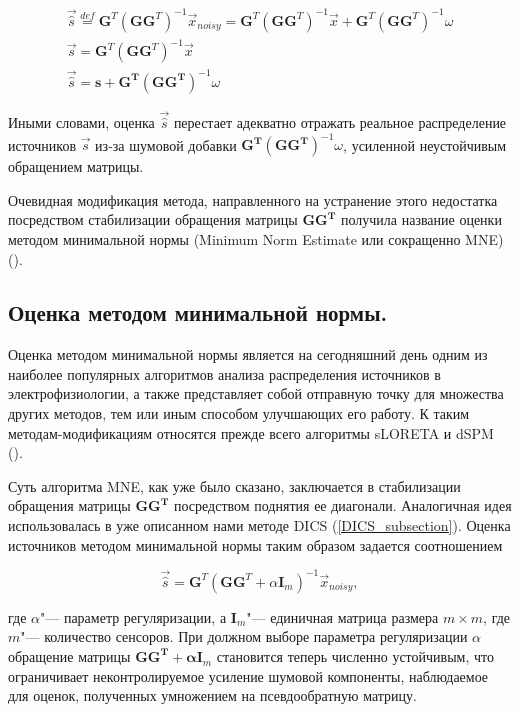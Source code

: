 \begin{gather*}
    \vec{\hat{s}} \stackrel{def}{=} \mathbf{G}^T{(\mathbf{G}\mathbf{G}^T)}^{-1}\vec{x}_{noisy} = 
    \mathbf{G}^T{(\mathbf{G}\mathbf{G}^T)}^{-1}\vec{x} +
    \mathbf{G}^T{(\mathbf{G}\mathbf{G}^T)}^{-1}\omega\\
    \vec{s} = \mathbf{G}^T{(\mathbf{G}\mathbf{G}^T)}^{-1}\vec{x}
    \\
    \vec{\hat{s}} =  \mathbf{s + G^T{(GG^T)}}^{-1}\omega
\end{gather*}

Иными словами, оценка $\vec{\hat{s}}$ перестает адекватно отражать реальное распределение
источников $\vec{s}$ из-за шумовой добавки $\mathbf{G^T{(GG^T)}}^{-1}\omega$, усиленной
неустойчивым обращением матрицы.

Очевидная модификация метода, направленного на устранение этого недостатка
посредством стабилизации обращения матрицы $\mathbf{GG^T}$ получила название
оценки методом минимальной нормы (Minimum Norm Estimate или сокращенно MNE)
(\cite{MNE_paper}).

\subsection{Оценка методом минимальной нормы.}

Оценка методом минимальной нормы является на сегодняшний день одним из наиболее
популярных алгоритмов анализа распределения источников в электрофизиологии, а
также представляет собой отправную точку для множества других методов, тем или
иным способом улучшающих его работу. К таким методам-модификациям относятся
прежде всего алгоритмы sLORETA и dSPM (\cite{sLORETA_paper, dSPM_paper}).

Суть алгоритма MNE, как уже было сказано, заключается в стабилизации обращения
матрицы $\mathbf{GG^T}$ посредством поднятия ее диагонали. Аналогичная идея
использовалась в уже описанном нами методе DICS (\ref{DICS_subsection}).
Оценка источников методом минимальной нормы таким образом задается соотношением

\begin{equation}
    \vec{\hat{s}} = \mathbf{G}^T(\mathbf{GG}^T + \alpha \mathbf{I}_m)^{-1}\vec{x}_{noisy},
    \label{MNE_estimation_formula}
\end{equation}

где $\alpha$"--- параметр регуляризации, а $\mathbf{I}_m$"--- единичная матрица
размера $m \times m$, где $m$"--- количество сенсоров. При должном выборе параметра
регуляризации $\alpha$ обращение матрицы $\mathbf{GG^T + \alpha I}_m$
становится теперь численно устойчивым, что ограничивает неконтролируемое
усиление шумовой компоненты, наблюдаемое для оценок, полученных умножением на
псевдообратную матрицу.

